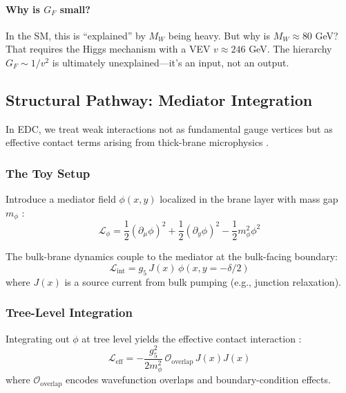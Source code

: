 \paragraph{\texorpdfstring{Why is $G_F$ small?}{Why is GF small?}}
In the SM, this is ``explained'' by $M_W$ being heavy. But why is $M_W \approx 80$ GeV?
That requires the Higgs mechanism with a VEV $v \approx 246$ GeV. The hierarchy
$G_F \sim 1/v^2$ is ultimately unexplained---it's an input, not an output.

\subsection{Structural Pathway: Mediator Integration}
\label{sec:ch11_structural}

In EDC, we treat weak interactions not as fundamental gauge vertices but as
effective contact terms arising from thick-brane microphysics \tagDc{}.

\subsubsection{The Toy Setup}

Introduce a mediator field $\phi(x,y)$ localized in the brane layer with mass
gap $m_\phi$ \tagP{}:
\begin{equation}
    \mathcal{L}_\phi = \frac{1}{2}(\partial_\mu\phi)^2 + \frac{1}{2}(\partial_y\phi)^2
    - \frac{1}{2}m_\phi^2 \phi^2
    \label{eq:ch11_L_phi}
\end{equation}

The bulk-brane dynamics couple to the mediator at the bulk-facing boundary:
\begin{equation}
    \mathcal{L}_{\text{int}} = g_5 \, J(x) \, \phi(x, y = -\delta/2)
    \label{eq:ch11_L_int}
\end{equation}
where $J(x)$ is a source current from bulk pumping (e.g., junction relaxation).

\subsubsection{Tree-Level Integration}

Integrating out $\phi$ at tree level yields the effective contact interaction
\tagDc{}:
\begin{equation}
    \boxed{
    \mathcal{L}_{\text{eff}} = -\frac{g_5^2}{2m_\phi^2} \,
    \mathcal{O}_{\text{overlap}} \, J(x) J(x)
    }
    \label{eq:ch11_Leff}
\end{equation}
where $\mathcal{O}_{\text{overlap}}$ encodes wavefunction overlaps and
boundary-condition effects.

